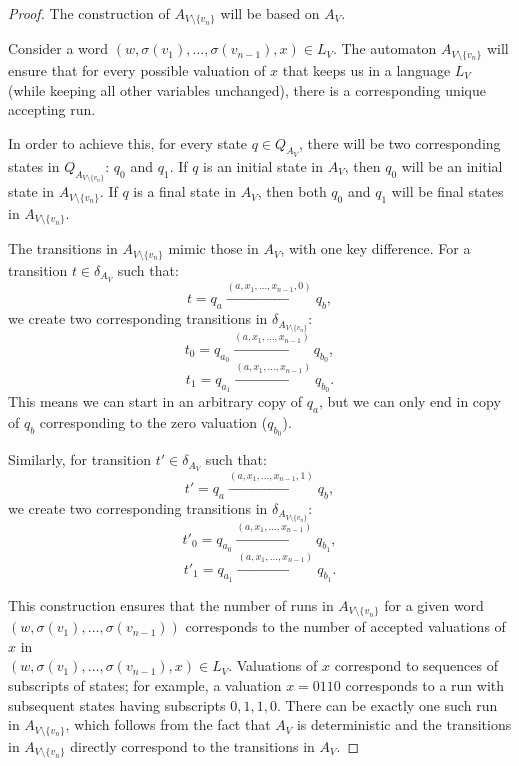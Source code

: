 \documentclass[en]{pracamgr}
\theoremstyle{definition}
\begin{document}
\begin{proof}
    The construction of $A_{V \setminus \{v_n\}}$ will be based on $A_V$.
    
    Consider a word $(w, \sigma(v_1), \ldots, \sigma(v_{n-1}), x) \in L_V$. The automaton $A_{V \setminus \{v_n\}}$ will ensure that for every possible valuation of $x$ that keeps us in a language $L_V$ (while keeping all other variables unchanged), there is a corresponding unique accepting run.

    In order to achieve this, for every state $q \in Q_{A_V}$, there will be two corresponding states in $Q_{A_{V \setminus \{v_n\}}}$: $q_0$ and $q_1$. If $q$ is an initial state in $A_V$, then $q_0$ will be an initial state in $A_{V \setminus \{v_n\}}$. If $q$ is a final state in $A_V$, then both $q_0$ and $q_1$ will be final states in $A_{V \setminus \{v_n\}}$.

    The transitions in $A_{V \setminus \{v_n\}}$ mimic those in $A_V$, with one key difference. For a transition $t \in \delta_{A_V}$ such that:
    $$t = q_a \xrightarrow{(a, x_1, \ldots, x_{n-1}, 0)} q_b,$$
    we create two corresponding transitions in $\delta_{A_{V \setminus \{v_n\}}}$:
    $$t_0 = q_{a_0} \xrightarrow{(a, x_1, \ldots, x_{n-1})} q_{b_0},$$
    $$t_1 = q_{a_1} \xrightarrow{(a, x_1, \ldots, x_{n-1})} q_{b_0}.$$
    This means we can start in an arbitrary copy of $q_a$, but we can only end in copy of $q_b$ corresponding to the zero valuation ($q_{b_0}$). 

    Similarly, for transition $t' \in \delta_{A_V}$ such that:
    $$t' = q_a \xrightarrow{(a, x_1, \ldots, x_{n-1}, 1)} q_b,$$
    we create two corresponding transitions in $\delta_{A_{V \setminus \{v_n\}}}$:
    $$t'_0 = q_{a_0} \xrightarrow{(a, x_1, \ldots, x_{n-1})} q_{b_1},$$
    $$t'_1 = q_{a_1} \xrightarrow{(a, x_1, \ldots, x_{n-1})} q_{b_1}.$$

    This construction ensures that the number of runs in $A_{V \setminus \{v_n\}}$ for a given word \\ $(w, \sigma(v_1), \ldots, \sigma(v_{n-1}))$ corresponds to the number of accepted valuations of $x$ in  \\ $(w, \sigma(v_1), \ldots, \sigma(v_{n-1}), x) \in L_V$. Valuations of $x$ correspond to sequences of subscripts of states; for example, a valuation $x = 0110$ corresponds to a run with subsequent states having subscripts $0, 1, 1, 0$. There can be exactly one such run in $A_{V \setminus \{v_n\}}$, which follows from the fact that $A_V$ is deterministic and the transitions in $A_{V \setminus \{v_n\}}$ directly correspond to the transitions in $A_V$.
\end{proof}
\end{document}
